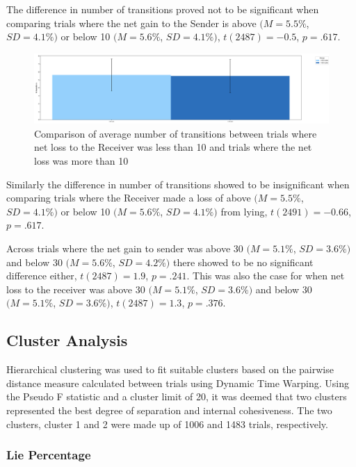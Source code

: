 \documentclass[man, floatsintext]{apa7}
\begin{document}
The difference in number of transitions proved not to be significant when comparing trials where the net gain to the Sender is above $(M = 5.5\%$, $SD = 4.1\%)$ or below 10 $(M = 5.6\%$, $SD = 4.1\%)$, $t(2487)=-0.5$, $p=.617$.

\begin{figure}[H]
	\centering
	\includegraphics[width=0.75\linewidth]{../plots/RESPONSE/NTransitionPerLossPlot.png}
	\caption{Comparison of average number of transitions between trials where net loss to the Receiver was less than 10 and trials where the net loss was more than 10}
	\label{fig:NTransitionPerLoss}
\end{figure}

Similarly the difference in number of transitions showed to be insignificant when comparing trials where the Receiver made a loss of above $(M = 5.5\%$, $SD = 4.1\%)$  or below 10 $(M = 5.6\%$, $SD = 4.1\%)$ from lying, $t(2491)=-0.66$, $p=.617$.

Across trials where the net gain to sender was above 30 $(M = 5.1\%$, $SD = 3.6\%)$ and below 30 $(M = 5.6\%$, $SD = 4.2\%)$ there showed to be no significant difference either, $t(2487)=1.9$, $p=.241$. This was also the case for when net loss to the receiver was above 30 $(M = 5.1\%$, $SD = 3.6\%)$ and below 30 $(M = 5.1\%$, $SD = 3.6\%)$, $t(2487)=1.3$, $p=.376$.

\subsection{Cluster Analysis}

Hierarchical clustering was used to fit suitable clusters based on the pairwise distance measure calculated between trials using Dynamic Time Warping. Using the Pseudo F statistic and a cluster limit of 20, it was deemed that two clusters represented the best degree of separation and internal cohesiveness. The two clusters, cluster 1 and 2 were made up of 1006 and 1483 trials, respectively.


\subsubsection{Lie Percentage}
\end{document}
